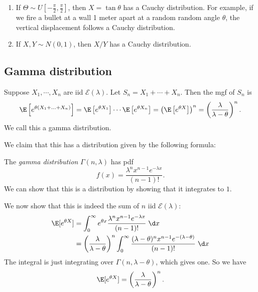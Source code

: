\documentclass[a4paper]{article}
\begin{document}
\begin{eg}\leavevmode
  \begin{enumerate}
    \item If $\Theta\sim U[-\frac{\pi}{2}, \frac{\pi}{2}]$, then $X = \tan \theta$ has a Cauchy distribution. For example, if we fire a bullet at a wall 1 meter apart at a random random angle $\theta$, the vertical displacement follows a Cauchy distribution.
      \begin{center}
      \end{center}
    \item If $X, Y\sim N(0, 1)$, then $X/Y$ has a Cauchy distribution.
  \end{enumerate}
\end{eg}

\subsection{Gamma distribution}
Suppose $X_1, \cdots, X_n$ are iid $\mathcal{E}(\lambda)$. Let $S_n = X_1 + \cdots + X_n$. Then the mgf of $S_n$ is
\[
  \E\left[e^{\theta(X_1 + \ldots + X_n)}\right] = \E\left[e^{\theta X_1}\right]\cdots \E\left[e^{\theta X_n}\right] = \left(\E\left[e^{\theta X}\right]\right)^n = \left(\frac{\lambda}{\lambda - \theta}\right)^n.
\]
We call this a gamma distribution.

We claim that this has a distribution given by the following formula:
\begin{defi}
  The \emph{gamma distribution} $\Gamma(n, \lambda)$ has pdf
  \[
    f(x) = \frac{\lambda^n x^{n - 1}e^{-\lambda x}}{(n - 1)!}.
  \]
  We can show that this is a distribution by showing that it integrates to $1$.
\end{defi}
We now show that this is indeed the sum of $n$ iid $\mathcal{E}(\lambda)$:
\begin{align*}
  \E[e^{\theta X}] &= \int_0^\infty e^{\theta x} \frac{\lambda^n x^{n - 1}e^{-\lambda x}}{(n - 1)!}\;\d x\\
  &= \left(\frac{\lambda}{\lambda - \theta}\right)^n \int_0^\infty \frac{(\lambda - \theta)^n x^{n - 1}e^{-(\lambda - \theta)}}{(n - 1)!}\;\d x
\end{align*}
The integral is just integrating over $\Gamma(n, \lambda - \theta)$, which gives one. So we have
\[
  \E[e^{\theta X}]= \left(\frac{\lambda}{\lambda - \theta}\right)^n.
\]
\end{document}
